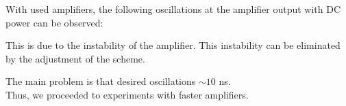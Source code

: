 With used amplifiers, the following oscillations at the amplifier output with DC power can be observed:

\begin{center}
\end{center}

This is due to the instability of the amplifier. This instability can be eliminated by the adjustment of the scheme. 

\phantom{42}

The main problem is that desired oscillations $\sim 10$ ns. \\
Thus, we proceeded to experiments with faster amplifiers.




